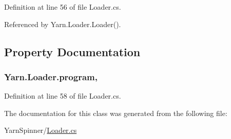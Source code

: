 Definition at line 56 of file Loader.\-cs.



Referenced by Yarn.\-Loader.\-Loader().



\subsection{Property Documentation}
\hypertarget{a00127_a6d8296076823c0c082df9024367f4860}{
\subsubsection[{program}]{ Yarn.\-Loader.\-program\hspace{0.3cm}{\ttfamily [get]}, {\ttfamily [set]}}}\label{a00127_a6d8296076823c0c082df9024367f4860}


Definition at line 58 of file Loader.\-cs.



The documentation for this class was generated from the following file\-:\begin{DoxyCompactItemize}
\item 
Yarn\-Spinner/\hyperlink{a00300}{Loader.\-cs}\end{DoxyCompactItemize}
